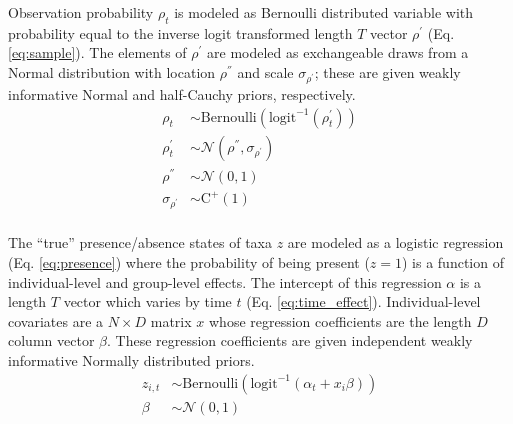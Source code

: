\documentclass[12pt,letterpaper]{article}
\begin{document}
Observation probability \(\rho_{t}\) is modeled as Bernoulli distributed variable with probability equal to the inverse logit transformed length \(T\) vector \(\rho^{\prime}\) (Eq. \ref{eq:sample}). The elements of \(\rho^{\prime}\) are modeled as exchangeable draws from a Normal distribution with location \(\rho^{''}\) and scale \(\sigma_{\rho^{\prime}}\); these are given weakly informative Normal and half-Cauchy priors, respectively. %
\begin{equation}
  \begin{aligned}
    \rho_{t} &\sim \text{Bernoulli}\left(\text{logit}^{-1}(\rho^{\prime}_{t})\right) \\
    \rho^{\prime}_{t} &\sim \mathcal{N}(\rho^{''}, \sigma_{\rho^{\prime}}) \\
    \rho^{''} &\sim \mathcal{N}(0, 1) \\
    \sigma_{\rho^{\prime}} &\sim \text{C}^{+}(1) \\
  \end{aligned}
  \label{eq:sample}
\end{equation}


The ``true'' presence/absence states of taxa \(z\) are modeled as a logistic regression (Eq. \ref{eq:presence}) where the probability of being present (\(z = 1\)) is a function of individual-level and group-level effects. The intercept of this regression \(\alpha\) is a length \(T\) vector which varies by time \(t\) (Eq. \ref{eq:time_effect}). Individual-level covariates are a \(N \times D\) matrix \(x\) whose regression coefficients are the length \(D\) column vector \(\beta\). These regression coefficients are given independent weakly informative Normally distributed priors.
\begin{equation}
  \begin{aligned}
    z_{i,t} &\sim \text{Bernoulli}\left(\text{logit}^{-1}(\alpha_{t} + x_{i} \beta)\right) \\
    \beta &\sim \mathcal{N}(0, 1) \\
  \end{aligned}
  \label{eq:presence}
\end{equation}
\end{document}
